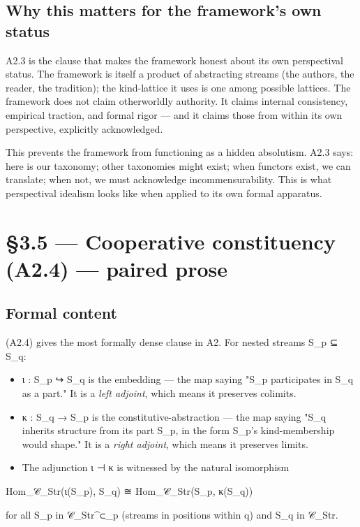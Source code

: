 \documentclass[11pt, openany]{book}
\newcommand{\sectionbreak}{\clearpage}
\begin{document}
\subsection{Why this matters for the framework's own status}

A2.3 is the clause that makes the framework honest about its own perspectival status. The framework is itself a product of abstracting streams (the authors, the reader, the tradition); the kind-lattice it uses is one among possible lattices. The framework does not claim otherworldly authority. It claims internal consistency, empirical traction, and formal rigor --- and it claims those from within its own perspective, explicitly acknowledged.

This prevents the framework from functioning as a hidden absolutism. A2.3 says: here is our taxonomy; other taxonomies might exist; when functors exist, we can translate; when not, we must acknowledge incommensurability. This is what perspectival idealism looks like when applied to its own formal apparatus.

\sectionbreak

\section{§3.5 --- Cooperative constituency (A2.4) --- paired prose}

\subsection{Formal content}

(A2.4) gives the most formally dense clause in A2. For nested streams S\_\allowbreak{}p ⊆ S\_\allowbreak{}q:

\begin{itemize}
\item ι : S\_\allowbreak{}p ↪ S\_\allowbreak{}q is the embedding --- the map saying "S\_\allowbreak{}p participates in S\_\allowbreak{}q as a part." It is a \textit{left adjoint}, which means it preserves colimits.
\item κ : S\_\allowbreak{}q → S\_\allowbreak{}p is the constitutive-abstraction --- the map saying "S\_\allowbreak{}q inherits structure from its part S\_\allowbreak{}p, in the form S\_\allowbreak{}p's kind-membership would shape." It is a \textit{right adjoint}, which means it preserves limits.
\item The adjunction ι ⊣ κ is witnessed by the natural isomorphism
\end{itemize}
\begin{Code}
  Hom_{𝒞_Str}(ι(S_p), S_q) ≅ Hom_{𝒞_Str}(S_p, κ(S_q))
\end{Code}
for all S\_\allowbreak{}p in 𝒞\_\allowbreak{}Str\textasciicircum{}⊂\_\allowbreak{}p (streams in positions within q) and S\_\allowbreak{}q in 𝒞\_\allowbreak{}Str.
\end{document}
